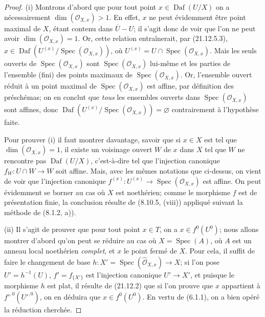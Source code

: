 \begin{proof}
(i) Montrons d'abord que pour tout point $x\in\operatorname{Daf}(U/X)$ on a
nécessairement $\dim(\mathcal O_{X,x})>1$. En effet, $x$ ne peut évidemment être point
maximal de $X$, étant contenu dans $\overline U-U$; il s'agit donc de voir que l'on ne
peut avoir $\dim(\mathcal O_{X,x})=1$. Or, cette relation entraînerait, par (21.12.5.3),
$x\in\operatorname{Daf}(U^{(x)}/\operatorname{Spec}(\mathcal O_{X,x}))$, où
$U^{(x)}=U\cap\operatorname{Spec}(\mathcal O_{X,x})$. Mais les seuls ouverts de
$\operatorname{Spec}(\mathcal O_{X,x})$ sont $\operatorname{Spec}(\mathcal O_{X,x})$
lui-même et les parties de l'ensemble (fini) des points maximaux de
$\operatorname{Spec}(\mathcal O_{X,x})$. Or, l'ensemble ouvert réduit à un point maximal
de $\operatorname{Spec}(\mathcal O_{X,x})$ est affine, par définition des préschémas; on
en conclut que \emph{tous} les ensembles ouverts dans
$\operatorname{Spec}(\mathcal O_{X,x})$ sont affines, donc
$\operatorname{Daf}(U^{(x)}/\operatorname{Spec}(\mathcal O_{X,x}))=\varnothing$
contrairement à l'hypothèse faite.

Pour prouver (i) il faut montrer davantage, savoir que si $x\in X$ est tel que
$\dim(\mathcal O_{X,x})=1$, il existe un voisinage ouvert $W$ de $x$ dans $X$ tel que
$W$ ne rencontre pas $\operatorname{Daf}(U/X)$, c'est-à-dire tel que l'injection
canonique $f_W:U\cap W\to W$ soit affine. Mais, avec les mêmes notations que ci-dessus,
on vient de voir que l'injection canonique
$f^{(x)}:U^{(x)}\to\operatorname{Spec}(\mathcal O_{X,x})$ est affine. On peut
évidemment se borner au cas où $X$ est noethérien; comme le morphisme $f$ est de
présentation finie, la conclusion résulte de (8.10.5, (viii)) appliqué suivant la
méthode de (8.1.2, a)).

(ii) Il s'agit de prouver que pour tout point $x\in T$, on a $x\in f^0(U^0)$; nous
allons montrer d'abord qu'on peut se réduire au cas où $X=\operatorname{Spec}(A)$, où
$A$ est un anneau local noethérien \emph{complet}, et $x$ le point fermé de $X$. Pour
cela, il suffit de faire le changement de base
$h:X'=\operatorname{Spec}(\widehat{\mathcal O}_{X,x})\to X$; si l'on pose
$U'=h^{-1}(U)$, $f'=f_{\{X'\}}$ est l'injection canonique $U'\to X'$, et puisque le
morphisme $h$ est plat, il résulte de (21.12.2) que si l'on prouve que $x$ appartient à
$f'^{,0}(U'^{,0})$, on en déduira que $x\in f^0(U^0)$. En vertu de (6.1.1), on a
bien opéré la réduction cherchée.


\end{proof}
